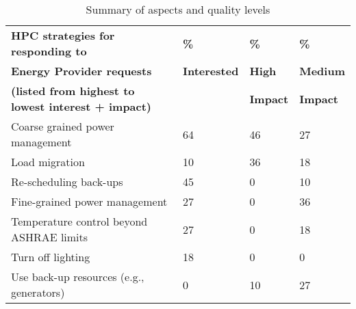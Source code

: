 \begin{table}[htbp]
\begin{center}
\caption{Summary of aspects and quality levels}
\begin{tabular}{|p{2.5in}|p{0.75in}|p{0.75in}|p{0.75in}|} \hline

\textbf{HPC strategies for responding to} &
\textbf{\%} &
\textbf{\%} &
\textbf{\%} \\

\textbf{Energy Provider requests} &
\textbf{Interested} &
\textbf{High} &
\textbf{Medium} \\

\textbf{(listed from highest to lowest interest + impact)} &
 &
\textbf{Impact} & 
\textbf{Impact} \\
\hline

Coarse grained power management &
64 &
46 &
27 \\

Load migration &
10 &
36 &
18 \\
\hline

Re-scheduling back-ups &
45 &
0 &
10 \\
\hline

Fine-grained power management &
27 &
0 &
36 \\
\hline

Temperature control beyond ASHRAE limits &
27 &
0 &
18 \\
\hline

Turn off lighting &
18 &
0 &
0 \\
\hline

Use back-up resources (e.g., generators) &
0 &
10 &
27 \\
\hline

\end{tabular}
\label{tab3}
\end{center}

\end{table}


%

